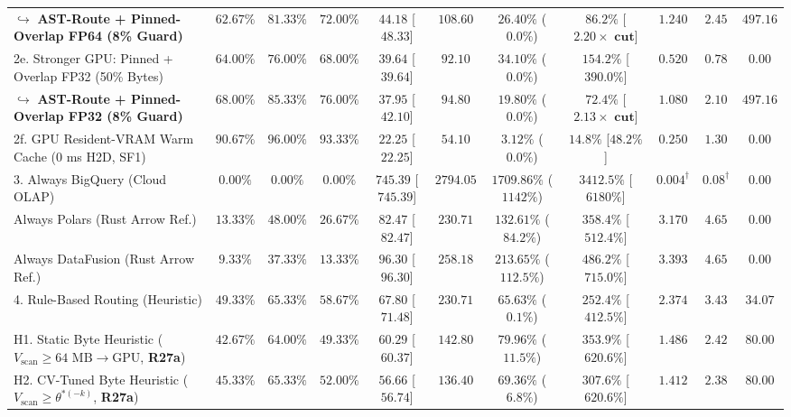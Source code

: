 \documentclass[10pt,a4paper]{article}
\newenvironment{fitasttable}{%
  \begin{lrbox}{\asttblbox}%
}{%
  \end{lrbox}%
  \sbox{\asttblboxB}{%
    \ifdim\wd\asttblbox>0.96\textwidth
      \resizebox{0.96\textwidth}{!}{\usebox{\asttblbox}}%
    \else
      \usebox{\asttblbox}%
    \fi
  }%
  \ifdim\ht\asttblboxB>0.72\textheight
    \resizebox{!}{0.72\textheight}{\usebox{\asttblboxB}}%
  \else
    \usebox{\asttblboxB}%
  \fi
}
\begin{document}
\begin{table}[!htbp]
\begin{fitasttable}
{\begin{tabular}{@{}lcccccccccc@{}}
\hspace*{0.8em}$\hookrightarrow$ \textbf{AST-Route + Pinned-Overlap FP64 (8\% Guard)} & $\mathbf{62.67\%}$ & $\mathbf{81.33\%}$ & $\mathbf{72.00\%}$ & $\mathbf{44.18}$ [$\mathbf{48.33}$] & $\mathbf{108.60}$ & $\mathbf{26.40\%}$ ($\mathbf{0.0\%}$) & $\mathbf{86.2\%}$ [$\mathbf{2.20\times\text{ cut}}$] & $\mathbf{1.240}$ & $\mathbf{2.45}$ & $\mathbf{497.16}$ \\
2e. Stronger GPU: Pinned + Overlap FP32 (50\% Bytes) & $64.00\%$ & $76.00\%$ & $68.00\%$ & $39.64$ [$39.64$] & $92.10$ & $34.10\%$ ($0.0\%$) & $154.2\%$ [$390.0\%$] & $0.520$ & $0.78$ & $0.00$ \\
\hspace*{0.8em}$\hookrightarrow$ \textbf{AST-Route + Pinned-Overlap FP32 (8\% Guard)} & $\mathbf{68.00\%}$ & $\mathbf{85.33\%}$ & $\mathbf{76.00\%}$ & $\mathbf{37.95}$ [$\mathbf{42.10}$] & $\mathbf{94.80}$ & $\mathbf{19.80\%}$ ($\mathbf{0.0\%}$) & $\mathbf{72.4\%}$ [$\mathbf{2.13\times\text{ cut}}$] & $\mathbf{1.080}$ & $\mathbf{2.10}$ & $\mathbf{497.16}$ \\
2f. GPU Resident-VRAM Warm Cache (0 ms H2D, SF1) & $90.67\%$ & $96.00\%$ & $93.33\%$ & $22.25$ [$22.25$] & $54.10$ & $3.12\%$ ($0.0\%$) & $14.8\%$ [$48.2\%$] & $0.250$ & $1.30$ & $0.00$ \\
3. Always BigQuery (Cloud OLAP) & $0.00\%$ & $0.00\%$ & $0.00\%$ & $745.39$ [$745.39$] & $2794.05$ & $1709.86\%$ ($1142\%$) & $3412.5\%$ [$6180\%$] & $0.004^{\dagger}$ & $0.08^{\dagger}$ & $0.00$ \\
Always Polars (Rust Arrow Ref.) & $13.33\%$ & $48.00\%$ & $26.67\%$ & $82.47$ [$82.47$] & $230.71$ & $132.61\%$ ($84.2\%$) & $358.4\%$ [$512.4\%$] & $3.170$ & $4.65$ & $0.00$ \\
Always DataFusion (Rust Arrow Ref.) & $9.33\%$ & $37.33\%$ & $13.33\%$ & $96.30$ [$96.30$] & $258.18$ & $213.65\%$ ($112.5\%$) & $486.2\%$ [$715.0\%$] & $3.393$ & $4.65$ & $0.00$ \\
4. Rule-Based Routing (Heuristic) & $49.33\%$ & $65.33\%$ & $58.67\%$ & $67.80$ [$71.48$] & $230.71$ & $65.63\%$ ($0.1\%$) & $252.4\%$ [$412.5\%$] & $2.374$ & $3.43$ & $34.07$ \\
H1. Static Byte Heuristic ($V_{\text{scan}}\ge 64\text{ MB}\rightarrow\text{GPU}$, \textbf{R27a}) & $42.67\%$ & $64.00\%$ & $49.33\%$ & $60.29$ [$60.37$] & $142.80$ & $79.96\%$ ($11.5\%$) & $353.9\%$ [$620.6\%$] & $1.486$ & $2.42$ & $80.00$ \\
H2. CV-Tuned Byte Heuristic ($V_{\text{scan}}\ge \theta^{*(-k)}$, \textbf{R27a}) & $45.33\%$ & $65.33\%$ & $52.00\%$ & $56.66$ [$56.74$] & $136.40$ & $69.36\%$ ($6.8\%$) & $307.6\%$ [$620.6\%$] & $1.412$ & $2.38$ & $80.00$ \\

\end{tabular}}
\end{fitasttable}
\end{table}
\end{document}
